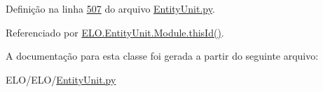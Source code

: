 Definição na linha \hyperlink{EntityUnit_8py_source_l00507}{507} do arquivo \hyperlink{EntityUnit_8py_source}{Entity\-Unit.\-py}.



Referenciado por \hyperlink{classELO_1_1EntityUnit_1_1Module_a7833604c3c13e2fdc5f4bce8712c2118}{E\-L\-O.\-Entity\-Unit.\-Module.\-this\-Id()}.



A documentação para esta classe foi gerada a partir do seguinte arquivo\-:\begin{DoxyCompactItemize}
\item 
E\-L\-O/\-E\-L\-O/\hyperlink{EntityUnit_8py}{Entity\-Unit.\-py}\end{DoxyCompactItemize}
